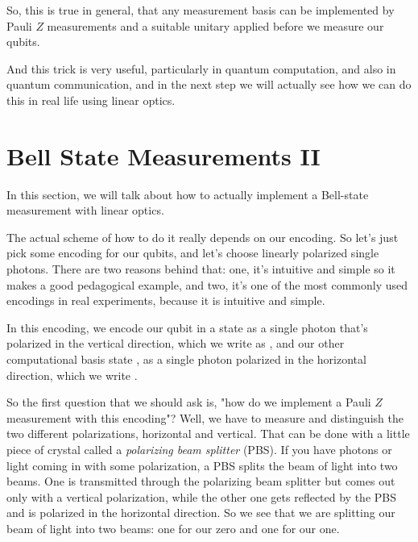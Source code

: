 So, this is true in general, that any measurement basis can be implemented by Pauli $Z$ measurements and a suitable unitary applied before we measure our qubits.

And this trick is very useful, particularly in quantum computation, and also in quantum communication, and in the next step we will actually see how we can do this in real life using linear optics.



\section{Bell State Measurements II}
\label{sec:13-3_Bell_state_measurement_2}

In this section, we will talk about how to actually implement a Bell-state measurement with linear optics.

The actual scheme of how to do it really depends on our encoding. So let's just pick some encoding for our qubits, and let's choose linearly polarized single photons. There are two reasons behind that: one, it's intuitive and simple so it makes a good pedagogical example, and two, it's one of the most commonly used encodings in real experiments, because it is intuitive and simple.

In this encoding, we encode our qubit in a state  as a single photon that's polarized in the vertical direction, which we write as , and our other computational basis state , as a single photon polarized in the horizontal direction, which we write .


So the first question that we should ask is, "how do we implement a Pauli $Z$ measurement with this encoding"? Well, we have to measure and distinguish the two different polarizations, horizontal and vertical. That can be done with a little piece of crystal called a \emph{polarizing beam splitter} (PBS). If you have photons or light coming in with some polarization, a PBS splits the beam of light into two beams. One is transmitted through the polarizing beam splitter but comes out only with a vertical polarization, while the other one gets reflected by the PBS and is polarized in the horizontal direction. So we see that we are splitting our beam of light into two beams: one for our zero and one for our one.  

